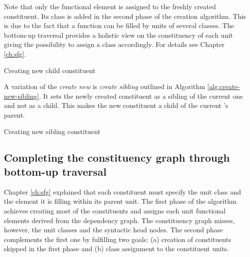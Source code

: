     Note that only the functional element is assigned to the freshly created constituent. Its class is added in the second phase of the creation algorithm. This is due to the fact that a function can be filled by units of several classes. The bottom-up traversal provides a holistic view on the constituency of each unit giving the possibility to assign a class accordingly. For details see Chapter \ref{ch:sfg}.

    \begin{algorithm}[!ht]
    \Input { \cgPointer, \Children, \elementType, \edge, \dg, \cg}
    	\caption{Creating new child constituent}
    	\label{alg:create-new}
    \end{algorithm}

    A variation of the \textit{create new} is \textit{create sibling} outlined in Algorithm \ref{alg:create-new-sibling}. It sets the newly created constituent as a sibling of the current one and not as a child. This makes the new constituent a child of the current \cgPointer's parent.

    \begin{algorithm}[!ht]
    	\Input { \cgPointer, \Children, \elementType, \edge, \dg, \cg}
    	\caption{Creating new sibling constituent}
    	\label{alg:create-new-sibling}
    \end{algorithm}

\subsection{Completing the constituency graph through bottom-up traversal}
    Chapter \ref{ch:sfg} explained that each constituent must specify the unit class and the element it is filling within its parent unit. The first phase of the algorithm achieves creating most of the constituents and assigns each unit functional elements derived from the dependency graph. The constituency graph misses, however, the unit classes and the syntactic head nodes. The second phase complements the first one by fulfilling two goals: (a) creation of constituents skipped in the first phase and (b) class assignment to the constituent units.

